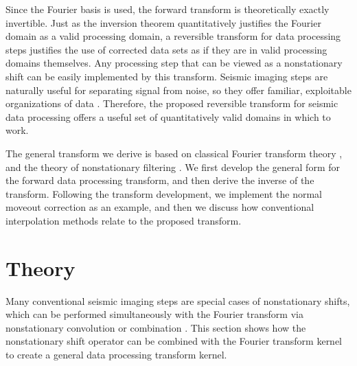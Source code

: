Since the Fourier basis is used, the forward transform is theoretically exactly invertible.
Just as the inversion theorem quantitatively justifies the Fourier domain as a valid processing domain, a reversible transform for data processing steps justifies the use of corrected data sets as if they are in valid processing domains themselves.
Any processing step that can be viewed as a nonstationary shift can be easily implemented by this transform.
Seismic imaging steps are naturally useful for separating signal from noise, so they offer familiar, exploitable organizations of data \cite{mcmechan_sun91,yu_etal05}.
Therefore, the proposed reversible transform for seismic data processing offers a useful set of quantitatively valid domains in which to work.
 
The general transform we derive is based on classical Fourier transform theory \cite{papoulis62,sneddon95}, and the theory of nonstationary filtering \cite{margrave98}.
We first develop the general form for the forward data processing transform, and then derive the inverse of the transform.  Following the transform development, we implement the normal moveout correction as an example, and then we discuss how conventional interpolation methods relate to the proposed transform.

\section{Theory}
\label{sec:DPTt}
Many conventional seismic imaging steps are special cases of nonstationary shifts, which can be performed simultaneously with the Fourier transform via nonstationary convolution or combination \cite{margrave98}.  This section shows how the nonstationary shift operator can be combined with the Fourier transform kernel to create a general data processing transform kernel.


